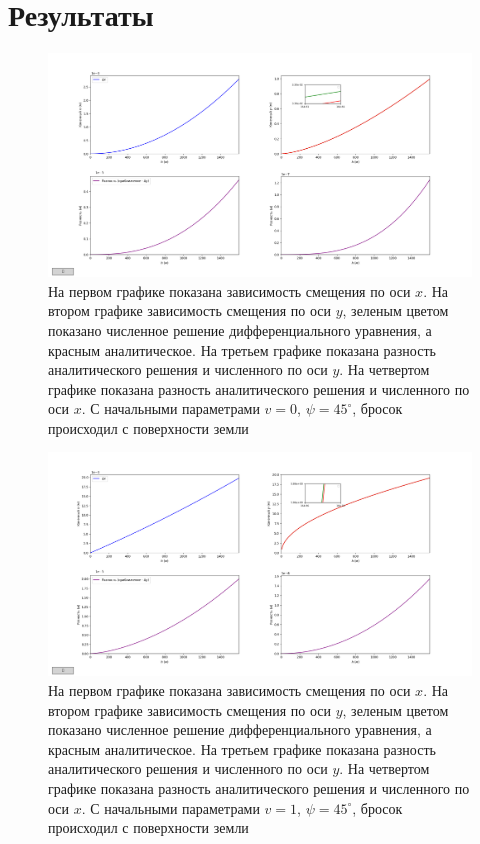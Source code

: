 \documentclass[hoptionsi, twocolumn]{revtex4-2}
\begin{document}
\section{Результаты}
 \begin{figure}[H]
\includegraphics[width=1\textwidth]{fig_1.png}
    \caption{На первом графике показана зависимость смещения по оси $x$. На втором графике зависимость смещения по оси $y$, зеленым цветом показано численное решение дифференциального уравнения, а красным аналитическое. На третьем графике показана разность аналитического решения и численного по оси $y$. На четвертом графике показана разность аналитического решения и численного по оси $x$. С начальными параметрами $v=0$, $\psi=45^{\circ}$, бросок происходил с поверхности земли}
\end{figure}
\begin{figure}[H]
\includegraphics[width=1\textwidth]{fig_2.png}
    \caption{На первом графике показана зависимость смещения по оси $x$. На втором графике зависимость смещения по оси $y$, зеленым цветом показано численное решение дифференциального уравнения, а красным аналитическое. На третьем графике показана разность аналитического решения и численного по оси $y$. На четвертом графике показана разность аналитического решения и численного по оси $x$. С начальными параметрами $v=1$, $\psi=45^{\circ}$, бросок происходил с поверхности земли}
\end{figure}
\end{document}
